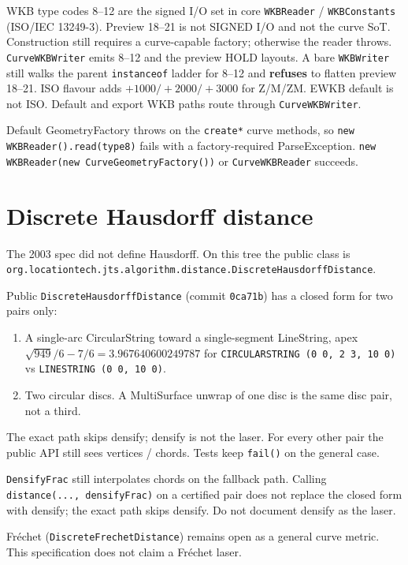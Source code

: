 \documentclass[11pt]{article}
\begin{document}
WKB type codes 8--12 are the signed I/O set in core
\texttt{WKBReader} / \texttt{WKBConstants} (ISO/IEC 13249-3).
Preview 18--21 is not SIGNED I/O and not the curve SoT.
Construction still requires a curve-capable factory; otherwise the
reader throws. \texttt{CurveWKBWriter} emits 8--12 and the preview
HOLD layouts. A bare \texttt{WKBWriter} still walks the parent
\texttt{instanceof} ladder for 8--12 and \textbf{refuses} to
flatten preview 18--21. ISO flavour adds $+1000/+2000/+3000$ for
Z/M/ZM. EWKB default is not ISO. Default and export WKB paths
route through \texttt{CurveWKBWriter}.

Default GeometryFactory throws on the \texttt{create*} curve
methods, so \texttt{new WKBReader().read(type8)} fails with a
factory-required ParseException.
\texttt{new WKBReader(new CurveGeometryFactory())} or
\texttt{CurveWKBReader} succeeds.


\section{Discrete Hausdorff distance}
The 2003 spec did not define Hausdorff. On this tree the public
class is
\texttt{org.locationtech.jts.algorithm.distance.DiscreteHausdorffDistance}.

Public \texttt{DiscreteHausdorffDistance} (commit \texttt{0ca71b})
has a closed form for two pairs only:
\begin{enumerate}
  \item A single-arc CircularString toward a single-segment
        LineString, apex $\sqrt{949}/6 - 7/6 = 3.967640600249787$ for
        \texttt{CIRCULARSTRING (0 0, 2 3, 10 0)} vs
        \texttt{LINESTRING (0 0, 10 0)}.
  \item Two circular discs. A
        MultiSurface unwrap of one disc is the same disc pair, not a
        third.
\end{enumerate}
The exact path skips densify; densify is not the laser. For every
other pair the public API still sees vertices / chords. Tests keep
\texttt{fail()} on the general case.

\texttt{DensifyFrac} still interpolates chords on the fallback path.
Calling \texttt{distance(..., densifyFrac)} on a certified pair does
not replace the closed form with densify; the exact path skips
densify. Do not document densify as the laser.

Fr\'echet (\texttt{DiscreteFrechetDistance}) remains open as a
general curve metric. This specification does not claim a Fr\'echet
laser.
\end{document}
